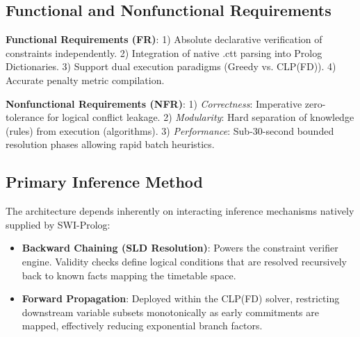 \documentclass[conference]{IEEEtran}
\begin{document}
\subsection{Functional and Nonfunctional Requirements}
\textbf{Functional Requirements (FR)}:
1) Absolute declarative verification of constraints independently. 
2) Integration of native .ctt parsing into Prolog Dictionaries. 
3) Support dual execution paradigms (Greedy vs. CLP(FD)).
4) Accurate penalty metric compilation.

\textbf{Nonfunctional Requirements (NFR)}:
1) \textit{Correctness}: Imperative zero-tolerance for logical conflict leakage.
2) \textit{Modularity}: Hard separation of knowledge (rules) from execution (algorithms).
3) \textit{Performance}: Sub-30-second bounded resolution phases allowing rapid batch heuristics.

\subsection{Primary Inference Method}
The architecture depends inherently on interacting inference mechanisms natively supplied by SWI-Prolog:
\begin{itemize}
    \item \textbf{Backward Chaining (SLD Resolution)}: Powers the constraint verifier engine. Validity checks define logical conditions that are resolved recursively back to known facts mapping the timetable space.
    \item \textbf{Forward Propagation}: Deployed within the CLP(FD) solver, restricting downstream variable subsets monotonically as early commitments are mapped, effectively reducing exponential branch factors.
\end{itemize}
\end{document}
